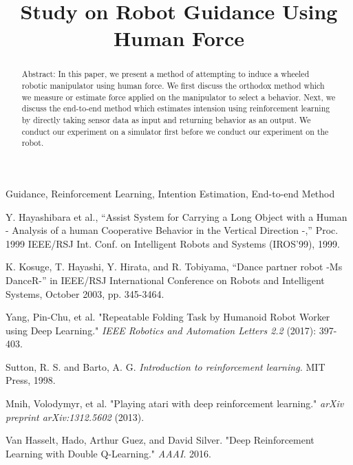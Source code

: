 \documentclass[conference]{IEEEtran}
\title{%
Study on Robot Guidance Using Human Force \\
}
\author{%
Joshua SUPRATMAN, Chiba Institute of Technology \\
$$$<$s1426071BL@s.chibakoudai.jp$>$ 
}
\begin{document}
\maketitle
\begin{abstract}
Abstract: In this paper, we present a method of attempting to induce a wheeled robotic manipulator using human force. We first discuss the orthodox method which we measure or estimate force applied on the manipulator to select a behavior. Next, we discuss the end-to-end method which estimates intension using reinforcement learning by directly taking sensor data as input and returning behavior as an output. We conduct our experiment on a simulator first before we conduct our experiment on the robot.
\end{abstract}

\begin{IEEEkeywords}
Guidance, Reinforcement Learning, Intention Estimation, End-to-end Method
\end{IEEEkeywords}









\begin{thebibliography}{9}
Y. Hayashibara et al., ``Assist System for Carrying a Long Object with a Human - Analysis of a human Cooperative Behavior in the Vertical Direction -,'' Proc. 1999 IEEE/RSJ Int. Conf. on Intelligent Robots and Systems (IROS'99), 1999.

K. Kosuge, T. Hayashi, Y. Hirata, and R. Tobiyama, ``Dance partner robot -Ms DanceR-'' in IEEE/RSJ International Conference on Robots and Intelligent Systems, October 2003, pp. 345-3464.

Yang, Pin-Chu, et al. "Repeatable Folding Task by Humanoid Robot Worker using Deep Learning." \textit{IEEE Robotics and Automation Letters 2.2} (2017): 397-403.

Sutton, R. S. and Barto, A. G. \textit{Introduction to reinforcement learning.} MIT Press, 1998.

Mnih, Volodymyr, et al. "Playing atari with deep reinforcement learning." \textit{arXiv preprint arXiv:1312.5602} (2013). 

Van Hasselt, Hado, Arthur Guez, and David Silver. "Deep Reinforcement Learning with Double Q-Learning." \textit{AAAI}. 2016.

\end{thebibliography}
\end{document}
